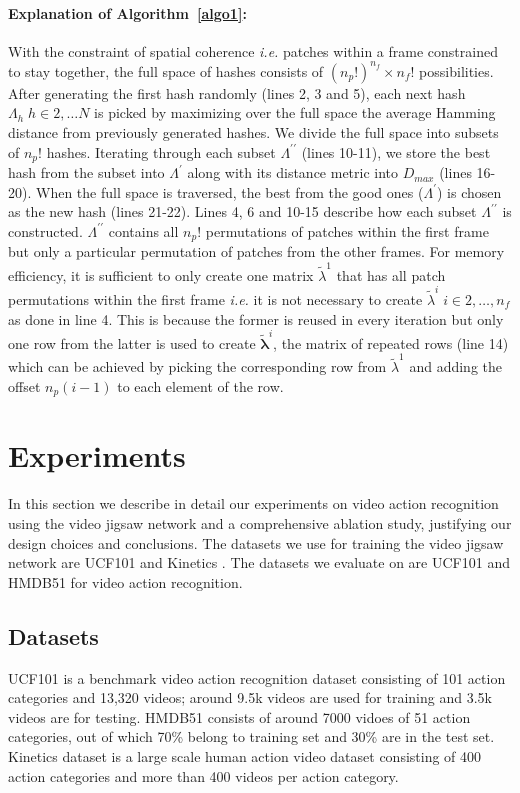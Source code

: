 \documentclass[10pt,twocolumn,letterpaper]{article}
\begin{document}
\paragraph{\textbf{Explanation of Algorithm~\ref{algo1}:}} With the constraint of spatial coherence \textit{i.e.} patches within a frame constrained to stay together, the full space of hashes consists of $(n_p!)^{n_f} \times n_f!$ possibilities. After generating the first hash randomly (lines 2, 3 and 5), each next hash $\Lambda_h\;h\in2,\dots N$ is picked by maximizing over the full space the average Hamming distance from previously generated hashes. We divide the full space into subsets of $n_p!$ hashes. Iterating through each subset $\Lambda^{\prime\prime}$ (lines 10-11), we store the best hash from the subset into $\Lambda^\prime$ along with its distance metric into $D_{max}$ (lines 16-20). When the full space is traversed, the best from the good ones ($\Lambda^\prime$) is chosen as the new hash (lines 21-22). Lines 4, 6 and 10-15 describe how each subset $\Lambda^{\prime\prime}$ is constructed. $\Lambda^{\prime\prime}$ contains all $n_p!$ permutations of patches within the first frame but only a particular permutation of patches from the other frames. For memory efficiency, it is sufficient to only create one matrix $\tilde\lambda^1$ that has all patch permutations within the first frame \textit{i.e.} it is not necessary to create $\tilde\lambda^i\;i\in2,\dots,n_f$ as done in line 4. This is because the former is reused in every iteration but only one row from the latter is used to create $\tilde{\boldsymbol\lambda}^i$, the matrix of repeated rows (line 14) which can be achieved by picking the corresponding row from $\tilde\lambda^1$ and adding the offset $n_p(i-1)$ to each element of the row.

\section{Experiments}
In this section we describe in detail our experiments on video action recognition using the video jigsaw network and a comprehensive ablation study, justifying our design choices and conclusions. The datasets we use for training the video jigsaw network are UCF101 \cite{soomro2012ucf101} and Kinetics \cite{kay2017kinetics}. The datasets we evaluate on are UCF101 \cite{soomro2012ucf101} and HMDB51 \cite{kuehne2011hmdb} for video action recognition.

\subsection{Datasets}
UCF101 \cite{soomro2012ucf101} is a benchmark video action recognition dataset consisting of 101 action categories and 13,320 videos; around 9.5k videos are used for training and 3.5k videos are for testing. HMDB51 \cite{kuehne2011hmdb} consists of around 7000 vidoes of 51 action categories, out of which 70\% belong to training set and 30\% are in the test set. Kinetics dataset \cite{kay2017kinetics} is a large scale human action video dataset consisting of 400 action categories and more than 400 videos per action category. 
\end{document}

